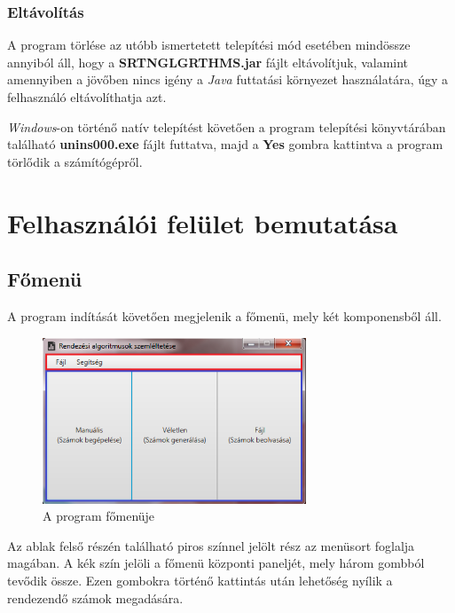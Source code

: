 \documentclass{elteikthesis}
\begin{document}
\subsubsection{Eltávolítás}
A program törlése az utóbb ismertetett telepítési mód esetében mindössze annyiból áll, hogy a \textbf{SRTNGLGRTHMS.jar} fájlt eltávolítjuk, valamint amennyiben a jövőben nincs igény a \emph{Java} futtatási környezet használatára, úgy a felhasználó eltávolíthatja azt.\par
\emph{Windows}-on történő natív telepítést követően a program telepítési könyvtárában található \textbf{unins000.exe} fájlt futtatva, majd a \textbf{Yes} gombra kattintva a program törlődik a számítógépről.

\section{Felhasználói felület bemutatása}
\subsection{Főmenü}
A program indítását követően megjelenik a főmenü, mely két komponensből áll.\par
\begin{figure}[H]
	\centering
	\includegraphics[width=0.7\textwidth]{pics/mainmenu.png}
	\caption{A program főmenüje}
\end{figure}
  Az ablak felső részén található piros színnel jelölt rész az menüsort foglalja magában. A kék szín jelöli a főmenü központi paneljét, mely három gombból tevődik össze. Ezen gombokra történő kattintás után lehetőség nyílik a rendezendő számok megadására.
\end{document}
